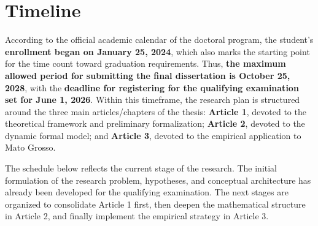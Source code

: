 
\section{Timeline}

According to the official academic calendar of the doctoral program, the student's \textbf{enrollment began on January 25, 2024}, which also marks the starting point for the time count toward graduation requirements. Thus, \textbf{the maximum allowed period for submitting the final dissertation is October 25, 2028}, with the \textbf{deadline for registering for the qualifying examination set for June 1, 2026}. Within this timeframe, the research plan is structured around the three main articles/chapters of the thesis: \textbf{Article 1}, devoted to the theoretical framework and preliminary formalization; \textbf{Article 2}, devoted to the dynamic formal model; and \textbf{Article 3}, devoted to the empirical application to Mato Grosso.

The schedule below reflects the current stage of the research. The initial formulation of the research problem, hypotheses, and conceptual architecture has already been developed for the qualifying examination. The next stages are organized to consolidate Article 1 first, then deepen the mathematical structure in Article 2, and finally implement the empirical strategy in Article 3.


